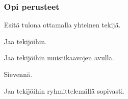 \begin{tehtavasivu}

\subsubsection*{Opi perusteet}

\begin{tehtava}
    Esitä tulona ottamalla yhteinen tekijä.
    \begin{vastaus}
    \end{vastaus}
\end{tehtava}

\begin{tehtava}
    Jaa tekijöihin.
    \begin{vastaus}
    \end{vastaus}
\end{tehtava}

\begin{tehtava}
    Jaa tekijöihin muistikaavojen avulla.
    \begin{vastaus}
    \end{vastaus}
\end{tehtava}

\begin{tehtava}
    Sievennä.
    \begin{vastaus}
    \end{vastaus}
\end{tehtava}

\begin{tehtava}
    Jaa tekijöihin ryhmittelemällä sopivasti.
    \begin{vastaus}
    \end{vastaus}
\end{tehtava}


\end{tehtavasivu}
